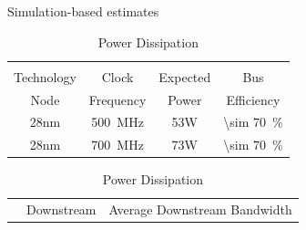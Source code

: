 \documentclass[journal]{IEEEtran}
\begin{document}
\begin{table}[h]
  \captionsetup{justification=centering, skip=3pt}
  \caption{Simulation-based estimates}
  \vspace{3pt}
  \label{tab:Simulation-based estimates}
  \centering
  \begin{subtable}{0.5\textwidth}
    \centering
    \begin{adjustbox}{width=0.75\textwidth}
      \begin{tabular}{cccc}
        \toprule
                         &                       &          &                                          \\  %
            Technology   & Clock                 & Expected &  Bus                                     \\  %
                Node     & Frequency             &  Power   &  Efficiency                              \\  %
        \hline  %
                   28nm  & \SI{500}{\mega\hertz} &   53W    &  \SI[per-mode=symbol]{\sim 70}{\percent} \\ %
                   28nm  & \SI{700}{\mega\hertz} &   73W    &  \SI[per-mode=symbol]{\sim 70}{\percent} \\ %
        \bottomrule
      \end{tabular}
    \end{adjustbox}
    \vspace{3pt}
    \captionsetup{justification=centering, skip=10pt}
    \caption{Power Dissipation}
    \label{tab:Power Dissipation}
  \end{subtable}
  \bigskip
  \begin{subtable}{0.5\textwidth}
    \centering
    \begin{adjustbox}{width=0.95\textwidth}
      \begin{tabular}{cccc}
        \toprule
                                                       & Downstream                              &                                        \multicolumn{2}{c}{Average Downstream Bandwidth}                      \\  %

\end{tabular}
\end{adjustbox}
\end{subtable}
\end{table}
\end{document}
